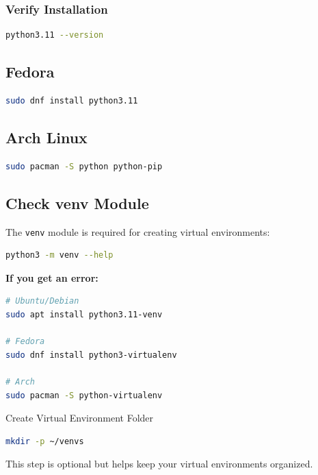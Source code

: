 \documentclass[11pt,a4paper]{article}
\begin{document}
\subsubsection{Verify Installation}

\begin{lstlisting}[language=bash]
python3.11 --version
\end{lstlisting}

\subsection{Fedora}

\begin{lstlisting}[language=bash]
sudo dnf install python3.11
\end{lstlisting}

\subsection{Arch Linux}

\begin{lstlisting}[language=bash]
sudo pacman -S python python-pip
\end{lstlisting}

\subsection{Check venv Module}

The \texttt{venv} module is required for creating virtual environments:

\begin{lstlisting}[language=bash]
python3 -m venv --help
\end{lstlisting}

\textbf{If you get an error:}
\begin{lstlisting}[language=bash]
# Ubuntu/Debian
sudo apt install python3.11-venv

# Fedora
sudo dnf install python3-virtualenv

# Arch
sudo pacman -S python-virtualenv
\end{lstlisting}



Create Virtual Environment Folder

\begin{lstlisting}[language=bash]
mkdir -p ~/venvs
\end{lstlisting}
\begin{tipbox}
This step is optional but helps keep your virtual environments organized.
\end{tipbox}
\end{document}
